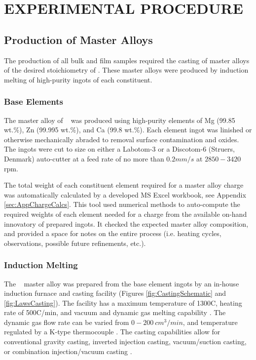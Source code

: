 \graphicspath{{./Z_images/Method_Images/}}

\chapter{EXPERIMENTAL PROCEDURE}

\section{Production of Master Alloys}
The production of all bulk and film samples required the casting of master alloys of the desired stoichiometry of \MgZnCa. These master alloys were produced by induction melting of high-purity ingots of each constituent.

\subsection{Base Elements}
The master alloy of \MgZnCa~ was produced using high-purity elements of Mg (99.85 wt.\%), Zn (99.995 wt.\%), and Ca (99.8 wt.\%). Each element ingot was linished or otherwise mechanically abraded to removal surface contamination and oxides. The ingots were cut to size on either a Labotom-3 or a Discotom-6 (Struers, Denmark) auto-cutter at a feed rate of no more than $0.2 mm/s$ at $2850 - 3420$ \acrshort{rpm}.

The total weight of each constituent element required for a master alloy charge was automatically calculated by a developed MS Excel workbook, see Appendix \ref{sec:AppChargeCalcs}. This tool used numerical methods to auto-compute the required weights of each element needed for a charge from the available on-hand innovatory of prepared ingots. It checked the expected master alloy composition, and provided a space for notes on the entire process (i.e. heating cycles, observations, possible future refinements, etc.).

\subsection{Induction Melting}

The \MgZnCa~ master alloy was prepared from the base element ingots by an in-house induction furnace and casting facility (Figures \ref{fig:CastingSchematic} and \ref{fig:LawsCasting}). The facility has a maximum temperature of 1300\degree C, heating rate of 500\degree C/min, and vacuum and dynamic gas melting capability \cite{Laws2007}. The dynamic gas flow rate can be varied from $0-200~ cm^{3}/min$, and temperature regulated by a K-type thermocouple \cite{Laws2007}. The casting capabilities allow for conventional gravity casting, inverted injection casting, vacuum/suction casting, or combination injection/vacuum casting \cite{Laws2007}.


